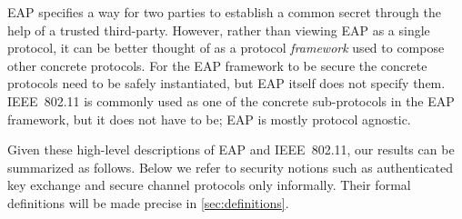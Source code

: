 EAP specifies a way for two parties to establish a common secret through the help of a trusted third-party.
However,
rather than viewing EAP as a single protocol,
it can be better thought of as a protocol \emph{framework} used to compose other concrete protocols.
For the EAP framework to be secure the concrete protocols need to be safely instantiated,
but EAP itself does not specify them.
IEEE~802.11 is commonly used as one of the concrete sub-protocols in the EAP framework,
but it does not have to be; 
EAP is mostly protocol agnostic.



Given these high-level descriptions of EAP and IEEE~802.11,
our results can be summarized as follows.
Below we refer to security notions such as authenticated key exchange and secure channel protocols only informally.
Their formal definitions will be made precise in \cref{sec:definitions}. 


